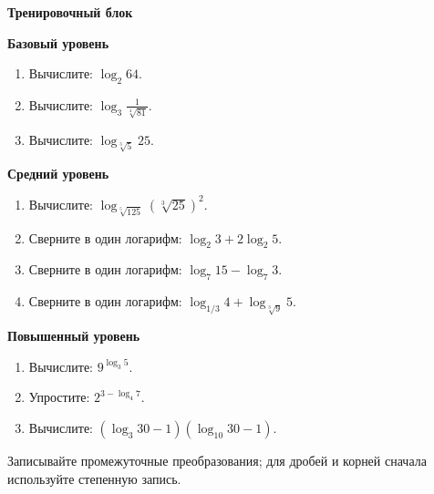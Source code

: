 \documentclass[a4paper,11pt]{article}
\begin{document}
\begin{center}{\Large\color{darkaccent}\bfseries Тренировочный блок}\par\vspace{3pt}{\small Путь А · 10 заданий · по возрастанию сложности}\end{center}
\vspace{6mm}
\textbf{Базовый уровень}
\begin{enumerate}[label=\arabic*.,itemsep=12pt]
\item Вычислите: $\displaystyle \log_2 64$.
\item Вычислите: $\displaystyle \log_3\frac{1}{\sqrt[4]{81}}$.
\item Вычислите: $\displaystyle \log_{\sqrt[3]{5}}25$.
\end{enumerate}
\vspace{3mm}
\textbf{Средний уровень}
\begin{enumerate}[label=\arabic*.,start=4,itemsep=12pt]
\item Вычислите: $\displaystyle \log_{\sqrt[5]{125}}\left(\sqrt[3]{25}\right)^2$.
\item Сверните в один логарифм: $\displaystyle \log_2 3+2\log_2 5$.
\item Сверните в один логарифм: $\displaystyle \log_7 15-\log_7 3$.
\item Сверните в один логарифм: $\displaystyle \log_{1/3}4+\log_{\sqrt[3]{9}}5$.
\end{enumerate}
\vspace{3mm}
\textbf{Повышенный уровень}
\begin{enumerate}[label=\arabic*.,start=8,itemsep=13pt]
\item Вычислите: $\displaystyle 9^{\log_3 5}$.
\item Упростите: $\displaystyle 2^{3-\log_4 7}$.
\item Вычислите: $\displaystyle \left(\log_3 30-1\right)\left(\log_{10}30-1\right)$.
\end{enumerate}
\vfill
\textcolor{softgray}{\small Записывайте промежуточные преобразования; для дробей и корней сначала используйте степенную запись.}
\clearpage
\end{document}
